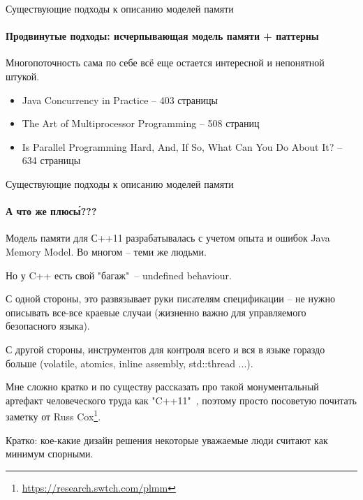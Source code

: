 \begin{frame}{Существующие подходы к описанию моделей памяти}
\framesubtitle{Продвинутые подходы: исчерпывающая модель памяти + паттерны}

Многопоточность сама по себе всё еще остается {\color{red} интересной и непонятной штукой}.
\begin{itemize}
	\item Java Concurrency in Practice -- 403 страницы
	\item The Art of Multiprocessor Programming -- 508 страниц
	\item Is Parallel Programming Hard, And, If So, What Can You Do About It? -- 634 страницы
\end{itemize}

\end{frame}



\begin{frame}{Существующие подходы к описанию моделей памяти}
\framesubtitle{А что же плюс\'{ы}???}

\pause
Модель памяти для С++11 разрабатывалась с учетом опыта и ошибок Java Memory Model. Во многом -- теми же людьми.

\pause
Но у C++ есть свой "багаж"\ -- undefined behaviour.

\pause
С одной стороны, это развязывает руки писателям спецификации -- не нужно описывать все-все краевые случаи (жизненно важно для управляемого безопасного языка).

\pause
С другой стороны, инструментов для контроля всего и вся в языке гораздо больше (volatile, atomics, inline assembly, std::thread ...).   

\pause
Мне сложно кратко и по существу рассказать про такой монументальный артефакт человеческого труда как "C++11"\ , поэтому просто посоветую почитать заметку от
Russ Cox\footnote<6->{\tiny\url{https://research.swtch.com/plmm}}.

\pause
Кратко: кое-какие дизайн решения некоторые уважаемые люди считают как минимум спорными.

\end{frame}



